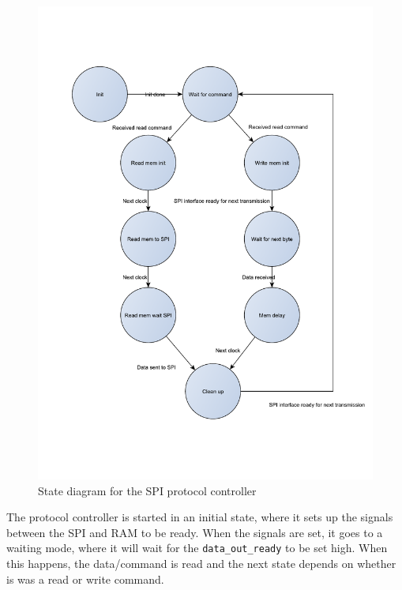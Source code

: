 \begin{figure}[htb] 
	\centering
	\includegraphics[scale=0.6,clip,trim=0 100 0 100]{graphics/spi_protocol_controller_prettystates.pdf} %
	\caption{State diagram for the SPI protocol controller}
	\label{fig:spi_protocol_controller_prettystates}
\end{figure}



The protocol controller is started in an initial state, where it sets up the signals between the SPI and RAM to be ready. When the signals are set, it goes to a waiting mode, where it will wait for the \texttt{data\_out\_ready} to be set high. When this happens, the data/command is read and the next state depends on whether is was a read or write command.

